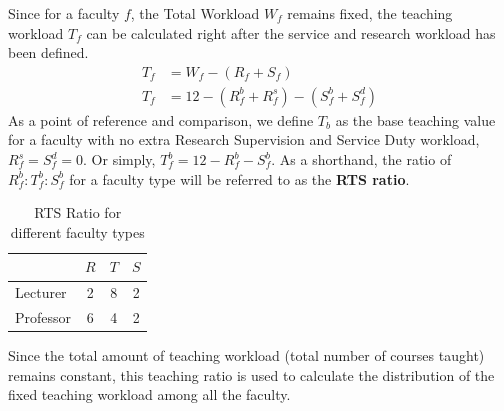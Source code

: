 Since for a faculty \(f\), the Total Workload \(W_f\) remains fixed, the teaching workload \(T_f\) can be calculated right after the service and research workload has been defined.
\begin{equation}
    \begin{aligned}
        T_f & = W_f - (R_f + S_f)                      \\
        T_f & = 12 - (R^b_f + R^s_f) - (S^b_f + S^d_f)
    \end{aligned}
\end{equation}
As a point of reference and comparison, we define \(T_b\) as the base teaching value for a faculty with no extra Research Supervision and Service Duty workload,  \(R^s_f = S^d_f = 0\). Or simply, \(T^b_f = 12 - R^b_f - S^b_f\). As a shorthand, the ratio of \(R^b_f : T^b_f  : S^b_f\)  for a faculty type will be referred to as the \textbf{RTS ratio}.

\begin{table}[h]
    \centering
    \begin{tabular} { |l |c |c|c|}
        \hline
                  & \(R\) & \(T\) & \(S\) \\
        \hline
        Lecturer  & 2     & 8     & 2     \\
        Professor & 6     & 4     & 2     \\
        \hline
    \end{tabular}
    \caption{RTS Ratio for different faculty types}
    \label{rts_ratio}
\end{table}

Since the total amount of teaching workload (total number of courses taught) remains constant, this teaching ratio is used to calculate the distribution of the fixed teaching workload among all the faculty.
